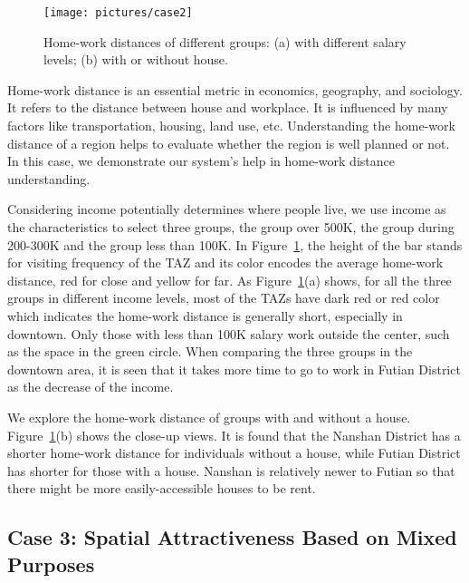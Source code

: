 
\begin{figure}[htb!]
 \centering %
 \texttt{[image: pictures/case2]}
 \caption{Home-work distances of different groups: (a) with different salary levels; (b) with or without house.}
 \label{case2}
\end{figure}


Home-work distance is an essential metric in economics, geography, and sociology. It refers to the distance between house and workplace. It is influenced by many factors like transportation, housing, land use, etc. Understanding the home-work distance of a region helps to evaluate whether the region is well planned or not. In this case, we demonstrate our system's help in home-work distance understanding.

Considering income potentially determines where people live, we use income as the characteristics to select three groups, the group over 500K, the group during 200-300K and the group less than 100K. In Figure~\ref{case2}, the height of the bar stands for visiting frequency of the TAZ and its color encodes the average home-work distance, red for close and yellow for far. As Figure~\ref{case2}(a) shows, for all the three groups in different income levels, most of the TAZs have dark red or red color which indicates the home-work distance is generally short, especially in downtown. Only those with less than 100K salary work outside the center, such as the space in the green circle. When comparing the three groups in the downtown area, it is seen that it takes more time to go to work in Futian District as the decrease of the income.

We explore the home-work distance of groups with and without a house.
Figure~\ref{case2}(b) shows the close-up views. It is found that the Nanshan District has a shorter home-work distance for individuals without a house, while Futian District has shorter for those with a house. Nanshan is relatively newer to Futian so that there might be more easily-accessible houses to be rent.



\subsection{Case 3: Spatial Attractiveness Based on Mixed Purposes}

